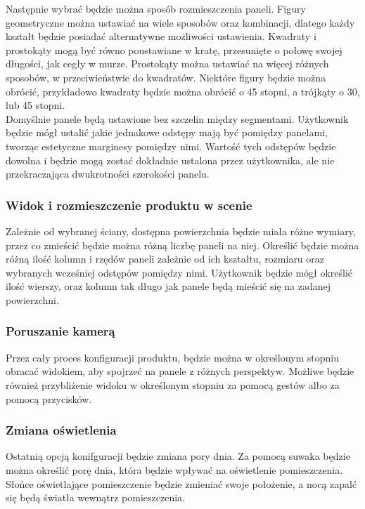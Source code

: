 \documentclass{article} %
\begin{document}
        Następnie wybrać będzie można sposób rozmieszczenia paneli. Figury geometryczne można ustawiać na wiele sposobów oraz kombinacji, dlatego każdy kształt będzie posiadać alternatywne możliwości ustawienia. Kwadraty i prostokąty mogą być równo poustawiane w kratę, przesunięte o połowę swojej długości, jak cegły w murze. Prostokąty można ustawiać na więcej różnych sposobów, w przeciwieństwie do kwadratów. Niektóre figury będzie można obrócić, przykładowo kwadraty będzie można obrócić o 45 stopni, a trójkąty o 30, lub 45 stopni.
        \\
        
        Domyślnie panele będą ustawione bez szczelin między segmentami. Użytkownik będzie mógł ustalić jakie jednakowe odstępy mają być pomiędzy panelami, tworząc estetyczne marginesy pomiędzy nimi. Wartość tych odstępów będzie dowolna i będzie mogą zostać dokładnie ustalona przez użytkownika, ale nie przekraczająca dwukrotności szerokości panelu.
        \\
        
        \subsubsection{Widok i rozmieszczenie produktu w scenie}
        Zależnie od wybranej ściany, dostępna powierzchnia będzie miała różne wymiary, przez co zmieścić będzie można różną liczbę paneli na niej. Określić będzie można różną ilość kolumn i rzędów paneli zależnie od ich kształtu, rozmiaru oraz wybranych wcześniej odstępów pomiędzy nimi. Użytkownik będzie mógł określić ilość wierszy, oraz kolumn tak długo jak panele będą mieścić się na zadanej powierzchni.
        \\
        
        \subsubsection{Poruszanie kamerą}
        Przez cały proces konfiguracji produktu, będzie można w określonym stopniu obracać widokiem, aby spojrzeć na panele z różnych perspektyw. Możliwe będzie również przybliżenie widoku w określonym stopniu za pomocą gestów albo za pomocą przycisków. 
        \\
        
        \subsubsection{Zmiana oświetlenia}
        Ostatnią opcją konifguracji będzie zmiana pory dnia. Za pomocą suwaka będzie można określić porę dnia, która będzie wpływać na oświetlenie pomieszczenia. Słońce oświetlające pomieszczenie będzie zmieniać swoje położenie, a nocą zapalć się będą światła wewnątrz pomieszczenia.
        \\
\end{document}
